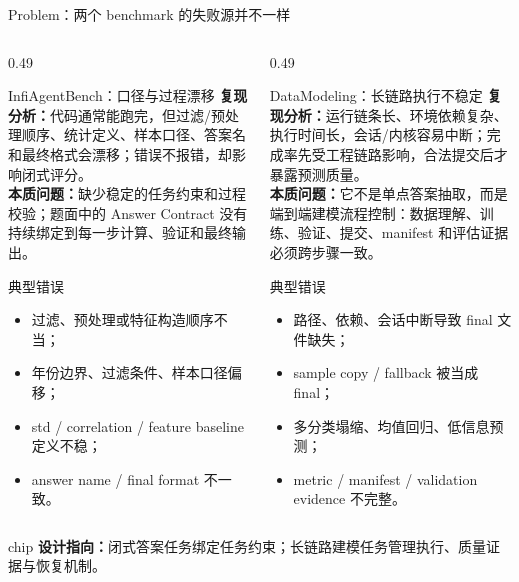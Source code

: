 \documentclass[aspectratio=169,UTF8]{ctexbeamer}
\begin{document}
\begin{frame}{Problem：两个 benchmark 的失败源并不一样}
\scriptsize
\begin{columns}[T]
\begin{column}{0.49\textwidth}
\begin{alertblock}{InfiAgentBench：口径与过程漂移}
\textbf{复现分析：}代码通常能跑完，但过滤/预处理顺序、统计定义、样本口径、答案名和最终格式会漂移；错误不报错，却影响闭式评分。\\[0.35em]
\textbf{本质问题：}缺少稳定的任务约束和过程校验；题面中的 Answer Contract 没有持续绑定到每一步计算、验证和最终输出。
\end{alertblock}
\vspace{0.2em}
\begin{block}{典型错误}
\begin{itemize}
  \item 过滤、预处理或特征构造顺序不当；
  \item 年份边界、过滤条件、样本口径偏移；
  \item std / correlation / feature baseline 定义不稳；
  \item answer name / final format 不一致。
\end{itemize}
\end{block}
\end{column}
\begin{column}{0.49\textwidth}
\begin{alertblock}{DataModeling：长链路执行不稳定}
\textbf{复现分析：}运行链条长、环境依赖复杂、执行时间长，会话/内核容易中断；完成率先受工程链路影响，合法提交后才暴露预测质量。\\[0.35em]
\textbf{本质问题：}它不是单点答案抽取，而是端到端建模流程控制：数据理解、训练、验证、提交、manifest 和评估证据必须跨步骤一致。
\end{alertblock}
\vspace{0.2em}
\begin{block}{典型错误}
\begin{itemize}
  \item 路径、依赖、会话中断导致 final 文件缺失；
  \item sample copy / fallback 被当成 final；
  \item 多分类塌缩、均值回归、低信息预测；
  \item metric / manifest / validation evidence 不完整。
\end{itemize}
\end{block}
\end{column}
\end{columns}
\vspace{0.08em}
\begin{beamercolorbox}[wd=\textwidth,sep=0.52ex,rounded=true,leftskip=0.75em,rightskip=0.75em]{chip}
\scriptsize\textbf{设计指向：}闭式答案任务绑定任务约束；长链路建模任务管理执行、质量证据与恢复机制。
\end{beamercolorbox}
\end{frame}
\end{document}
